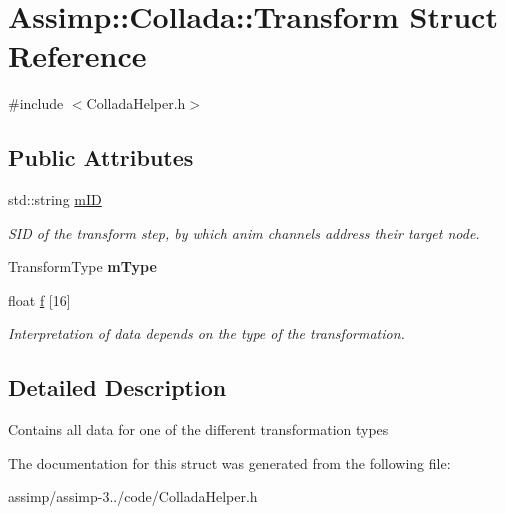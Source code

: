 \hypertarget{struct_assimp_1_1_collada_1_1_transform}{\section{Assimp\+:\+:Collada\+:\+:Transform Struct Reference}
\label{struct_assimp_1_1_collada_1_1_transform}
}


{\ttfamily \#include $<$Collada\+Helper.\+h$>$}

\subsection*{Public Attributes}
\begin{DoxyCompactItemize}
\item 
\hypertarget{struct_assimp_1_1_collada_1_1_transform_aec1371090d82521f793062aca96f5f4d}{std\+::string \hyperlink{struct_assimp_1_1_collada_1_1_transform_aec1371090d82521f793062aca96f5f4d}{m\+I\+D}}\label{struct_assimp_1_1_collada_1_1_transform_aec1371090d82521f793062aca96f5f4d}

\begin{DoxyCompactList}\small\item\em S\+I\+D of the transform step, by which anim channels address their target node. \end{DoxyCompactList}\item 
\hypertarget{struct_assimp_1_1_collada_1_1_transform_aac62aaa1b635c67dab37a0b47a18d2a5}{Transform\+Type {\bfseries m\+Type}}\label{struct_assimp_1_1_collada_1_1_transform_aac62aaa1b635c67dab37a0b47a18d2a5}

\item 
\hypertarget{struct_assimp_1_1_collada_1_1_transform_ab984e3229962e4084a94e8e5550f2378}{float \hyperlink{struct_assimp_1_1_collada_1_1_transform_ab984e3229962e4084a94e8e5550f2378}{f} \mbox{[}16\mbox{]}}\label{struct_assimp_1_1_collada_1_1_transform_ab984e3229962e4084a94e8e5550f2378}

\begin{DoxyCompactList}\small\item\em Interpretation of data depends on the type of the transformation. \end{DoxyCompactList}\end{DoxyCompactItemize}


\subsection{Detailed Description}
Contains all data for one of the different transformation types 

The documentation for this struct was generated from the following file\+:\begin{DoxyCompactItemize}
\item 
assimp/assimp-\/3../code/Collada\+Helper.\+h\end{DoxyCompactItemize}
